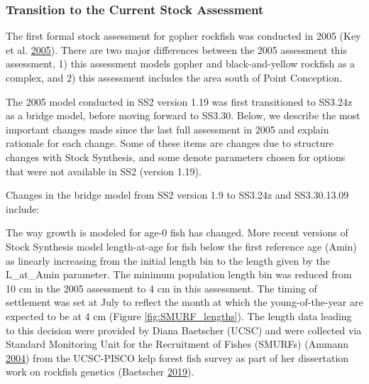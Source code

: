 \documentclass[12pt,]{article}
\begin{document}
\subsubsection{Transition to the Current Stock
Assessment}\label{transition-to-the-current-stock-assessment}

The first formal stock assessment for gopher rockfish was conducted in
2005 (Key et al. \protect\hyperlink{ref-Key2005}{2005}). There are two
major differences between the 2005 assessment this assessment, 1) this
assessment models gopher and black-and-yellow rockfish as a complex, and
2) this assessment includes the area south of Point Conception.

The 2005 model conducted in SS2 version 1.19 was first transitioned to
SS3.24z as a bridge model, before moving forward to SS3.30. Below, we
describe the most important changes made since the last full assessment
in 2005 and explain rationale for each change. Some of these items are
changes due to structure changes with Stock Synthesis, and some denote
parameters chosen for options that were not available in SS2 (version
1.19).

Changes in the bridge model from SS2 version 1.9 to SS3.24z and
SS3.30.13.09 include:

The way growth is modeled for age-0 fish has changed. More recent
versions of Stock Synthesis model length-at-age for fish below the first
reference age (Amin) as linearly increasing from the initial length bin
to the length given by the L\_at\_Amin parameter. The minimum population
length bin was reduced from 10 cm in the 2005 assessment to 4 cm in this
assessment. The timing of settlement was set at July to reflect the
month at which the young-of-the-year are expected to be at 4 cm (Figure
\ref{fig:SMURF_lengths}). The length data leading to this decision were
provided by Diana Baetscher (UCSC) and were collected via Standard
Monitoring Unit for the Recruitment of Fishes (SMURFs) (Ammann
\protect\hyperlink{ref-Ammann2004}{2004}) from the UCSC-PISCO kelp
forest fish survey as part of her dissertation work on rockfish genetics
(Baetscher \protect\hyperlink{ref-Baetscher2019}{2019}).
\end{document}
